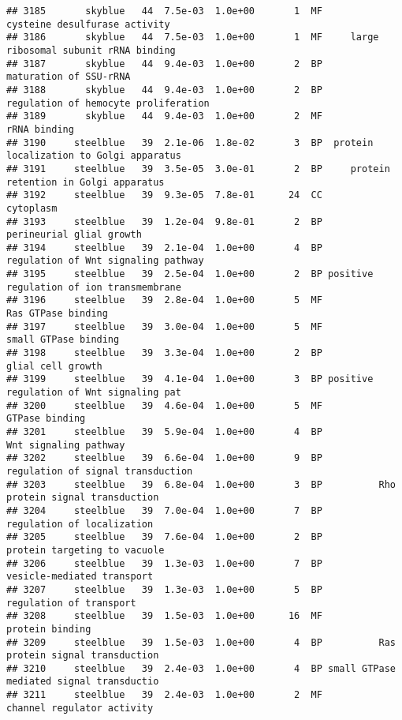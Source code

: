 \documentclass[]{article}
\begin{document}
\begin{verbatim}
## 3185       skyblue   44  7.5e-03  1.0e+00       1  MF            cysteine desulfurase activity
## 3186       skyblue   44  7.5e-03  1.0e+00       1  MF     large ribosomal subunit rRNA binding
## 3187       skyblue   44  9.4e-03  1.0e+00       2  BP                   maturation of SSU-rRNA
## 3188       skyblue   44  9.4e-03  1.0e+00       2  BP     regulation of hemocyte proliferation
## 3189       skyblue   44  9.4e-03  1.0e+00       2  MF                             rRNA binding
## 3190     steelblue   39  2.1e-06  1.8e-02       3  BP  protein localization to Golgi apparatus
## 3191     steelblue   39  3.5e-05  3.0e-01       2  BP     protein retention in Golgi apparatus
## 3192     steelblue   39  9.3e-05  7.8e-01      24  CC                                cytoplasm
## 3193     steelblue   39  1.2e-04  9.8e-01       2  BP                 perineurial glial growth
## 3194     steelblue   39  2.1e-04  1.0e+00       4  BP      regulation of Wnt signaling pathway
## 3195     steelblue   39  2.5e-04  1.0e+00       2  BP positive regulation of ion transmembrane
## 3196     steelblue   39  2.8e-04  1.0e+00       5  MF                       Ras GTPase binding
## 3197     steelblue   39  3.0e-04  1.0e+00       5  MF                     small GTPase binding
## 3198     steelblue   39  3.3e-04  1.0e+00       2  BP                        glial cell growth
## 3199     steelblue   39  4.1e-04  1.0e+00       3  BP positive regulation of Wnt signaling pat
## 3200     steelblue   39  4.6e-04  1.0e+00       5  MF                           GTPase binding
## 3201     steelblue   39  5.9e-04  1.0e+00       4  BP                    Wnt signaling pathway
## 3202     steelblue   39  6.6e-04  1.0e+00       9  BP        regulation of signal transduction
## 3203     steelblue   39  6.8e-04  1.0e+00       3  BP          Rho protein signal transduction
## 3204     steelblue   39  7.0e-04  1.0e+00       7  BP               regulation of localization
## 3205     steelblue   39  7.6e-04  1.0e+00       2  BP             protein targeting to vacuole
## 3206     steelblue   39  1.3e-03  1.0e+00       7  BP               vesicle-mediated transport
## 3207     steelblue   39  1.3e-03  1.0e+00       5  BP                  regulation of transport
## 3208     steelblue   39  1.5e-03  1.0e+00      16  MF                          protein binding
## 3209     steelblue   39  1.5e-03  1.0e+00       4  BP          Ras protein signal transduction
## 3210     steelblue   39  2.4e-03  1.0e+00       4  BP small GTPase mediated signal transductio
## 3211     steelblue   39  2.4e-03  1.0e+00       2  MF               channel regulator activity

\end{verbatim}
\end{document}
